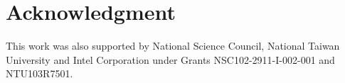 \section*{Acknowledgment}
This work was also supported by National Science Council, National Taiwan University and Intel Corporation under Grants NSC102-2911-I-002-001 and NTU103R7501.